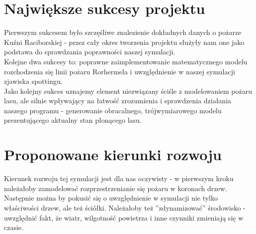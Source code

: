 \documentclass[a4paper, 11pt]{article}
\begin{document}
	\section*{Największe sukcesy projektu}
	\indent
	
	Pierwszym sukcesem było szczęśliwe znalezienie dokładnych danych o pożarze Kuźni Raciborskiej - przez cały okres tworzenia projektu służyły nam one jako podstawa do sprawdzania poprawności naszej symulacji.\\
	
	Kolejne dwa sukcesy to: poprawne zaimplementowanie  matematycznego modelu rozchodzenia się linii pożaru Rorhermela i uwzględnienie w naszej symulacji zjawiska spottingu.\\
	
	Jako kolejny sukces uznajemy element niezwiązany ściśle z modelowaniem pożaru lasu, ale silnie wpływający na łatwość zrozumienia i sprawdzenia działania naszego programu - generowanie obracalnego, trójwymiarowego modelu prezentującego aktualny stan płonącego lasu.
	
	\section*{Proponowane kierunki rozwoju}
	\indent
	
	Kierunek rozwoju tej symulacji jest dla nas oczywisty - w pierwszym kroku należałoby zamodelować rozprzestrzenianie się pożaru w koronach drzew. Następnie można by pokusić się o uwzględnienie w symulacji nie tylko właściwości drzew, ale też ściółki. Należałoby też ''zdynamizować'' środowisko - uwzględnić fakt, że wiatr, wilgotność powietrza i inne czynniki zmieniają się w czasie.
\end{document}
